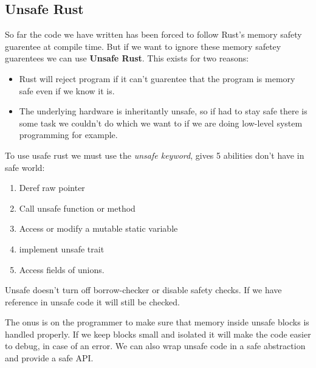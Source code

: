 \subsection{Unsafe Rust}

So far the code we have written has been forced to follow Rust's memory safety guarentee at compile time. But if we want to ignore these memory safetey guarentees we can use \textbf{Unsafe Rust}. This exists for two reasons:\begin{itemize}
    \item Rust will reject program if it can't guarentee that the program is memory safe even if we know it is.
    \item The underlying hardware is inheritantly unsafe, so if had to stay safe there is some task we couldn't do which we want to if we are doing low-level system programming for example.
\end{itemize} 
To use usafe rust we must use the \textit{unsafe keyword}, gives 5 abilities don't have in safe world:\begin{enumerate}
    \item Deref raw pointer
    \item Call unsafe function or method
    \item Access or modify a mutable static variable
    \item implement unsafe trait
    \item Access fields of unions.
\end{enumerate}
Unsafe doesn't turn off borrow-checker or disable safety checks. If we have reference in unsafe code it will still be checked.

The onus is on the programmer to make sure that memory inside unsafe blocks is handled properly. If we keep blocks small and isolated it will make the code easier to debug, in case of an error. We can also wrap unsafe code in a safe abstraction and provide a safe API. 

